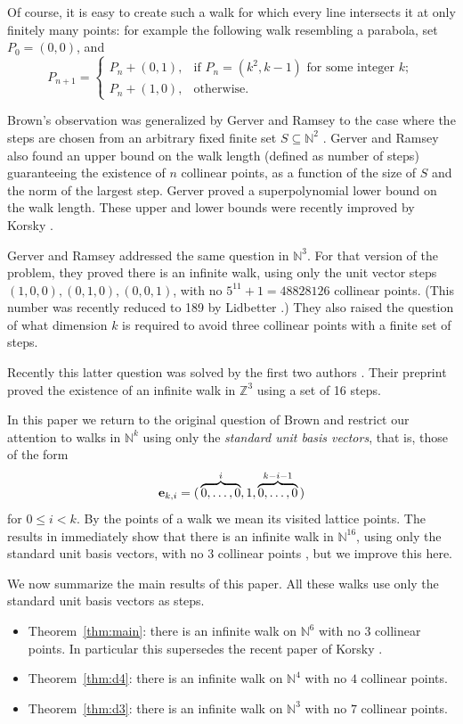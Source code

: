 \documentclass[12pt,reqno]{article}
\newcommand{\Z}{\mathbb Z}
\newcommand{\N}{\mathbb N}
\begin{document}
Of course, it is easy to create such a walk for which every line intersects it at only finitely many points:  for example the following walk resembling a parabola, set $P_0 = (0,0)$, and
$$ P_{n+1} = \begin{cases}
    P_n + (0,1), & \text{if $P_n = (k^2,k-1)$ for some integer $k$}; \\
    P_n + (1,0), & \text{otherwise.} 
    \end{cases}
$$

Brown's observation was generalized by Gerver and Ramsey to the case where the steps are chosen from an arbitrary fixed finite set $S \subseteq \N^2$ \cite{GR79}.
Gerver and Ramsey also found an upper bound on the walk length (defined as number of steps) guaranteeing the existence of $n$ collinear points, as a function of the size of $S$ and the norm of the largest step. Gerver \cite{Ger79} proved a superpolynomial lower bound on the walk length.  These upper and lower bounds were recently improved by
Korsky \cite{Ko26a}.

Gerver and Ramsey addressed the same question in $\N^3$.  For that version of the problem, they proved there is an infinite walk, using only the
unit vector steps 
$(1,0,0), (0,1,0), (0,0,1)$, with no
$5^{11} + 1 = 48828126$ collinear points.
(This number was recently reduced to 189
by Lidbetter \cite{Lid24}.)
They also raised the question of what dimension $k$ is required to avoid
three collinear points with a finite set of steps.

Recently this latter question was solved by the first two authors \cite{CK26}.  Their preprint proved the existence of an infinite walk in $\Z^3$ using a set of 16 steps. 

In this paper we return to the original question of Brown and restrict our attention to walks in $\N^k$ using only the {\it standard unit basis vectors}, that is, those of the form $${\bf e}_{k,i} = (\, \overbrace{0,\ldots, 0}^i, 1, 
\overbrace{0,\ldots, 0}^{k-i-1} \,)$$
for $0 \leq i < k$.  By the points of a walk we mean its visited lattice points.  The results in \cite{CK26} immediately show that there is an infinite walk in $\N^{16}$, using only the standard unit basis vectors, with no $3$ collinear points \cite{Sha26}, but we improve this here.

We now summarize the main results of this paper.  All these walks use only the standard unit basis vectors as steps.

\begin{itemize}
\item Theorem~\ref{thm:main}: there is an infinite walk on $\N^6$
with no $3$ collinear points.  In particular this supersedes the recent paper of Korsky \cite{Ko26b}.

\item Theorem~\ref{thm:d4}:  there is an infinite walk on $\N^4$ with no $4$ collinear points.

\item Theorem~\ref{thm:d3}:  there is an infinite walk on $\N^3$ with no $7$ collinear points.
\end{itemize}
\end{document}
